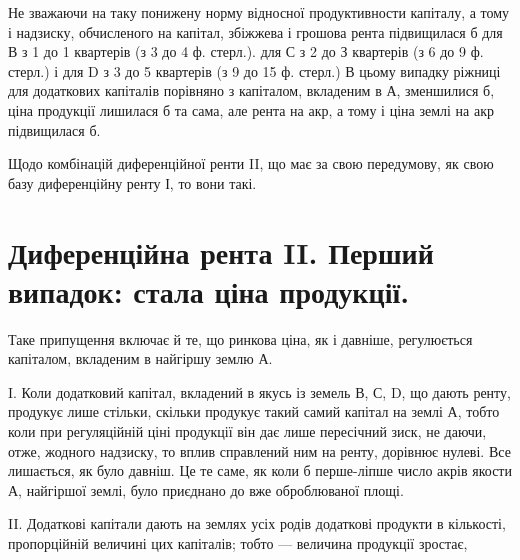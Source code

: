 Не зважаючи на таку понижену норму відносної продуктивности капіталу,
а тому і надзиску, обчисленого на капітал, збіжжева і грошова рента підвищилася
б для В з 1 до 1  квартерів (з 3 до 4  ф. стерл.). для С з 2 до
З квартерів (з 6 до 9 ф. стерл.) і для D з 3 до 5 квартерів (з 9 до 15 ф. стерл.)
В цьому випадку ріжниці для додаткових капіталів порівняно з капіталом,
вкладеним в А, зменшилися б, ціна продукції лишилася б та сама, але рента
на акр, а тому і ціна землі на акр підвищилася б.

Щодо комбінацій диференційної ренти II, що має за свою передумову, як
свою базу диференційну ренту І, то вони такі.

\section{Диференційна рента II. Перший випадок: стала ціна продукції.}

Таке припущення включає й те, що ринкова ціна, як і давніше, регулюється
капіталом, вкладеним в найгіршу землю А.

I. Коли додатковий капітал, вкладений в якусь із земель В, С, D, що
дають ренту, продукує лише стільки, скільки продукує такий самий капітал на
землі А, тобто коли при регуляційній ціні продукції він дає лише пересічний
зиск, не даючи, отже, жодного надзиску, то вплив справлений ним на ренту, дорівнює
нулеві. Все лишається, як було давніш. Це те саме, як коли б перше-ліпше
число акрів якости А, найгіршої землі, було приєднано до вже оброблюваної
площі.

II. Додаткові капітали дають на землях усіх родів додаткові продукти в кількості,
пропорційній величині цих капіталів; тобто — величина продукції зростає,
\parbreak{}  %
